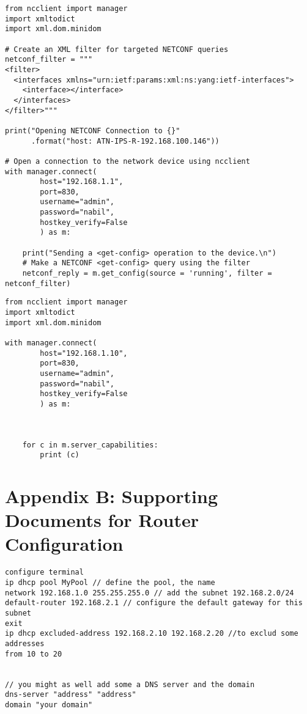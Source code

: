 \begin{lstlisting}[style=pythonStyle, caption={Get-config.}, backgroundcolor=\color{codebackground}]
from ncclient import manager
import xmltodict
import xml.dom.minidom

# Create an XML filter for targeted NETCONF queries
netconf_filter = """
<filter>
  <interfaces xmlns="urn:ietf:params:xml:ns:yang:ietf-interfaces">
    <interface></interface>
  </interfaces>
</filter>"""

print("Opening NETCONF Connection to {}"
      .format("host: ATN-IPS-R-192.168.100.146"))

# Open a connection to the network device using ncclient
with manager.connect(
        host="192.168.1.1",
        port=830,
        username="admin", 
        password="nabil",
        hostkey_verify=False
        ) as m:

    print("Sending a <get-config> operation to the device.\n")
    # Make a NETCONF <get-config> query using the filter
    netconf_reply = m.get_config(source = 'running', filter = netconf_filter)          
\end{lstlisting}
\begin{lstlisting}[style=pythonStyle, caption={Get-capabilities.}, backgroundcolor=\color{codebackground}]
from ncclient import manager
import xmltodict
import xml.dom.minidom

with manager.connect(
        host="192.168.1.10",
        port=830,
        username="admin",
        password="nabil",
        hostkey_verify=False
        ) as m:


        
    for c in m.server_capabilities:
        print (c)         
\end{lstlisting}


\section{Appendix B: Supporting Documents for Router Configuration}

\begin{lstlisting}[style=cliStyle, caption={Configure DHCP.},  backgroundcolor=\color{codebackground}]
configure terminal
ip dhcp pool MyPool // define the pool, the name 
network 192.168.1.0 255.255.255.0 // add the subnet 192.168.2.0/24
default-router 192.168.2.1 // configure the default gateway for this subnet 
exit 
ip dhcp excluded-address 192.168.2.10 192.168.2.20 //to exclud some addresses 
from 10 to 20


// you might as well add some a DNS server and the domain 
dns-server "address" "address"
domain "your domain"
\end{lstlisting}

